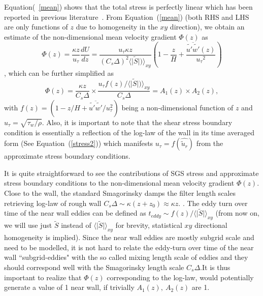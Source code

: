 Equation(~\ref{mean}) shows that the total stress is perfectly linear which has been reported in previous literature~\cite{kimmoinmoser,brass}.
From Equation~(\ref{mean}) (both RHS and LHS are {only} function{s} of $z$ due to homogeneity in the $xy$ direction), we obtain an estimate of the non-dimensional mean velocity gradient $\Phi(z)$ as 
\begin{equation}
\Phi(z) = \frac{\kappa z}{u_{\tau}}\frac{dU}{dz} = \frac{u_{\tau}\kappa z}{(C_s\Delta)^2 \langle \vert \widetilde{S} \vert)\rangle_{xy}}\left(1 - \frac{z}{H} + \frac{\overline{\widetilde{u'}\widetilde{w'}}(z)}{{u_{\tau}}^2}\right)
\end{equation}
, which can be further simplified as
\begin{equation}
\boxed{\Phi(z) = \frac{\kappa z}{C_s \Delta} \times \frac{u_{\tau} f(z)/ \langle\vert \widetilde{S} \vert)\rangle_{xy}}{C_s \Delta}} = A_1(z)\times A_2(z), \label{mean2b}
\end{equation}
with $f(z) = (1 - z/H + \overline{\widetilde{u'}\widetilde{w'}}/u_{\tau}^2)$ being a non-dimensional function of $z$ and $u_{\tau} = \sqrt{\tau_{w}/\rho}$. Also, it is important to note that the shear stress boundary condition is essentially a reflection of the log-law of the wall in its time averaged form (See Equation~(\ref{stress2})) which manifests $u_{\tau} = f(\widehat{\widetilde{u}_r})$ from the approximate stress boundary conditions.

It is quite straightforward to see the contributions of SGS stress and approximate stress boundary conditions {to} the non-dimensional mean velocity gradient $\Phi(z)$. {Close to the wall, the standard Smagorinsky damps the filter length scales retrieving log-law of rough wall $C_s\Delta \sim \kappa (z + z_0) \approx \kappa z$.} . The eddy turn over time of the near wall eddies {can be defined as} $t_{eddy} \sim f(z)/\langle\vert \widetilde{S} \vert\rangle_{xy}$ ({from now on,} we will use just $\widetilde{S}$ instead of $\langle\vert \widetilde{S} \vert\rangle_{xy}$ for brevity, statistical $x{y}$ directional homogeneity is implied). Since the near wall eddies are mostly subgrid scale and need to be modelled, it is not hard to relate  the eddy-turn over time of the near wall ``subgrid-eddies" with the so called {mixing length scale of eddies and they should correspond well with the Smagorinsky length scale $C_s \Delta$}.{It is thus important to realize that $\Phi (z)$ corresponding to the log-law, would potentially generate a value of 1 near wall, if trivially $A_1(z), \ A_2(z)$ are 1.}   


